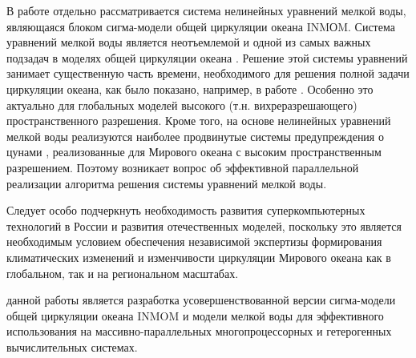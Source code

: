 В работе отдельно рассматривается система нелинейных уравнений мелкой воды,
являющаяся блоком сигма-модели общей циркуляции океана INMОM.
Система уравнений мелкой воды является неотъемлемой и одной из самых важных подзадач в моделях общей циркуляции океана  .
Решение этой системы уравнений занимает существенную часть времени, необходимого для решения полной задачи циркуляции океана,
как было показано, например, в работе \cite{ChaplyginINMOM2017}.
Особенно это актуально для глобальных моделей высокого (т.н. вихреразрешающего) пространственного разрешения.
Кроме того, на основе нелинейных уравнений мелкой воды реализуются наиболее продвинутые системы
предупреждения о цунами , реализованные для Мирового океана с высоким пространственным разрешением.
Поэтому возникает вопрос об эффективной параллельной реализации алгоритма решения системы уравнений мелкой воды.

Следует особо подчеркнуть необходимость развития суперкомпьютерных технологий в России и развития отечественных моделей, поскольку это является необходимым условием обеспечения независимой экспертизы формирования климатических изменений и изменчивости циркуляции Мирового океана как в глобальном, так и на региональном масштабах.


{\aim} данной работы является разработка усовершенствованной версии сигма-модели общей циркуляции океана INMOM и модели мелкой воды для эффективного использования на массивно-параллельных многопроцессорных и гетерогенных вычислительных системах.


